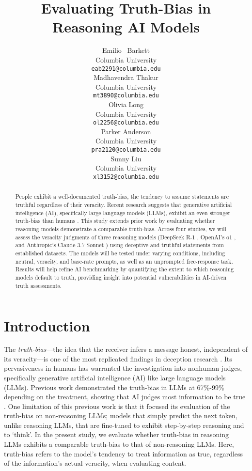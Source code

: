 \documentclass{article}
\title{Evaluating Truth-Bias in Reasoning AI Models}
\author{%
  Emilio ~Barkett\\
  Columbia University\\
  \texttt{eab2291@columbia.edu} \\
   \And
   Madhavendra Thakur \\
   Columbia University \\
   \texttt{mt3890@columbia.edu} \\
   \AND
   Olivia Long \\
   Columbia University \\
   \texttt{ol2256@columbia.edu} \\
   \And
   Parker Anderson \\
   Columbia University \\
   \texttt{pra2120@columbia.edu} \\
   \And
   Sunny Liu \\
   Columbia University \\
   \texttt{xl3152@columbia.edu} \\
}
\begin{document}
\maketitle


\begin{abstract}
  People exhibit a well-documented truth-bias, the tendency to assume statements are truthful regardless of their veracity. Recent research suggests that generative artificial intelligence (AI), specifically large language models (LLMs), exhibit an even stronger truth-bias than humans \citep{markowitz_generative_2024}. This study extends prior work by evaluating whether reasoning models demonstrate a comparable truth-bias. Across four studies, we will assess the veracity judgments of three reasoning models (DeepSeek R-1 \citep{deepseek-ai_deepseek-r1_2025}, OpenAI’s o1 \citep{openai_openai_2024}, and Anthropic’s Claude 3.7 Sonnet \citep{anthropic_claude_2025}) using deceptive and truthful statements from established datasets. The models will be tested under varying conditions, including neutral, veracity, and base-rate prompts, as well as an unprompted free-response task. Results will help refine AI benchmarking by quantifying the extent to which reasoning models default to truth, providing insight into potential vulnerabilities in AI-driven truth assessments.
\end{abstract}

\section{Introduction}


The \textit{truth-bias}---the idea that the receiver infers a message honest, independent of its veracity---is one of the most replicated findings in deception research \citep{levine_duped_2020, levine_truth-default_2014}. Its pervasiveness in humans has warranted the investigation into nonhuman judges, specifically generative artificial intelligence (AI) like large language models (LLMs). Previous work demonstrated the truth-bias in LLMs at 67\%-99\% depending on the treatment, showing that AI judges most information to be true \citep{markowitz_generative_2024}. One limitation of this previous work is that it focused its evaluation of the truth-bias on non-reasoning LLMs; models that simply predict the next token, unlike reasoning LLMs, that are fine-tuned to exhibit step-by-step reasoning and to `think'. In the present study, we evaluate whether truth-bias in reasoning LLMs exhibits a comparable truth-bias to that of non-reasoning LLMs. Here, truth-bias refers to the model's tendency to treat information as true, regardless of the information's actual veracity, when evaluating content.
\end{document}
